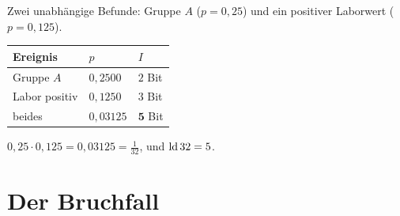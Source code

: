 \begin{merksatz}
Zwei unabhängige Befunde: Gruppe $A$ ($p=0{,}25$) und ein positiver Laborwert ($p=0{,}125$).

\begin{center}
\renewcommand{\arraystretch}{1.5}
\begin{tabular}{@{}P{2.8cm}P{2.4cm}P{2.4cm}@{}}
\toprule
\textbf{Ereignis} & $p$ & $I$\\
\midrule
Gruppe $A$ & $0{,}2500$ & $2$ Bit\\
Labor positiv & $0{,}1250$ & $3$ Bit\\
\midrule
beides & $0{,}03125$ & $\mathbf{5}$ Bit\\
\bottomrule
\end{tabular}
\end{center}

 $0{,}25 \cdot 0{,}125 = 0{,}03125 = \frac{1}{32}$, und $\operatorname{ld} 32 = 5$. \checkmark

\begin{center}
\begin{minipage}{0.88\textwidth}
\end{minipage}
\end{center}
\end{merksatz}

\section{Der Bruchfall}

